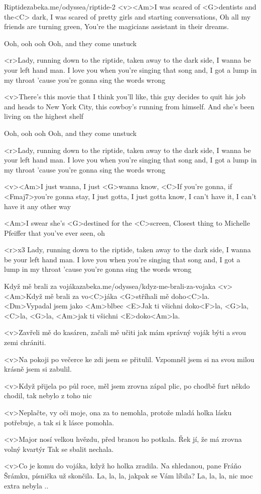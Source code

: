 \begin{song}{3}{Riptide}{zabeka.me/odyssea/riptide-2}
	<v><Am>I was scared of <G>dentists and the<C> dark,
	I was scared of pretty girls and starting conversations,
	Oh all my friends are turning green,
	You're the magicians assistant in their dreams.

	Ooh, ooh ooh
	Ooh, and they come unstuck

	<r>Lady, running down to the riptide,
	taken away to the dark side,
	I wanna be your left hand man.
	I love you when you're singing that song and,
	I got a lump in my throat 'cause
	you're gonna sing the words wrong

	<v>There's this movie that I think you'll like,
	this guy decides to quit his job and heads to New York City,
	this cowboy's running from himself.
	And she's been living on the highest shelf

	Ooh, ooh ooh
	Ooh, and they come unstuck

	<r>Lady, running down to the riptide,
	taken away to the dark side,
	I wanna be your left hand man.
	I love you when you're singing that song and,
	I got a lump in my throat 'cause
	you're gonna sing the words wrong

	<v><Am>I just wanna, I just <G>wanna know,
	<C>If you're gonna, if <Fmaj7>you're gonna stay,
	I just gotta, I just gotta know,
	I can't have it, I can't have it any other way

	<Am>I swear she's <G>destined for the <C>screen,
	Closest thing to Michelle Pfeiffer that you've ever seen, oh

	<r>x3
	Lady, running down to the riptide,
	taken away to the dark side,
	I wanna be your left hand man.
	I love you when you're singing that song and,
	I got a lump in my throat 'cause
	you're gonna sing the words wrong
\end{song}
\begin{song}{4}{Když mě brali za vojáka}{zabeka.me/odyssea/kdyz-me-brali-za-vojaka}
	<v><Am>Když mě brali za vo<C>jáka
	<G>stříhali mě doho<C>la.
	<Dm>Vypadal jsem jako <Am>blbec
	<E>Jak ti všichni doko<F>la,
	<G>la, <C>la, <G>la, <Am>jak ti všichni <E>doko<Am>la.

	<v>Zavřeli mě do kasáren,
	začali mě učiti
	jak mám správný voják býti
	a svou zemi chrániti.

	<v>Na pokoji po večerce
	ke zdi jsem se přitulil.
	Vzpomněl jsem si na svou milou
	krásně jsem si zabulil.

	<v>Když přijela po půl roce,
	měl jsem zrovna zápal plic,
	po chodbě furt někdo chodil,
	tak nebylo z toho nic

	<v>Neplačte, vy oči moje,
	ona za to nemohla,
	protože mladá holka lásku potřebuje,
	a tak si k lásce pomohla.

	<v>Major nosí velkou hvězdu,
	před branou ho potkala.
	Řek jí, že má zrovna volný kvartýr
	Tak se sbalit nechala.

	<v>Co je komu do vojáka,
	když ho holka zradila.
	Na shledanou, pane Fráňo Šrámku,
	písnička už skončila.
	La, la, la, jakpak se Vám líbila?
	La, la, la, nic moc extra nebyla ..
\end{song}
